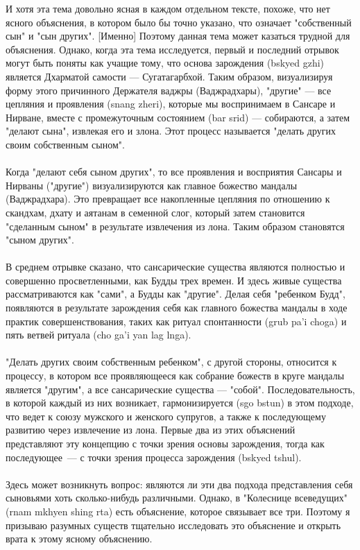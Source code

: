 \begin{siderules}
И хотя эта тема довольно ясная в каждом отдельном тексте, похоже, что нет ясного
объяснения, в котором было бы точно указано, что означает "собственный сын" и "сын
других". [Именно] Поэтому данная тема может казаться трудной для объяснения.
Однако, когда эта тема исследуется, первый и последний отрывок могут быть поняты как учащие
тому, что основа зарождения (bskyed gzhi) является Дхарматой самости — Сугатагарбхой.
Таким образом, визуализируя форму этого причинного Держателя ваджры (Ваджрадхары),
"другие" — все цепляния и проявления (snang zheri), которые мы воспринимаем в Сансаре и
Нирване, вместе с промежуточным состоянием (bar srid) — собираются, а затем
"делают сына", извлекая его и злона. Этот процесс называется "делать других
своим собственным сыном".\\
\\
Когда "делают себя сыном других", то все проявления и восприятия Сансары и Нирваны
("другие") визуализируются как главное божество мандалы (Ваджрадхара). Это превращает
все накопленные цепляния по отношению к скандхам, дхату и аятанам в семенной слог,
который затем становится "сделанным сыном" в результате извлечения из лона. Таким
образом становятся "сыном других".\\
\\
В среднем отрывке сказано, что сансарические существа являются полностью и совершенно
просветленными, как Будды трех времен. И здесь живые существа рассматриваются как
"сами", а Будды как "другие". Делая себя "ребенком Будд", появляются в результате
зарождения себя как главного божества мандалы в ходе практик совершенствования,
таких как ритуал спонтанности (grub pa'i choga) и пять ветвей ритуала (cho ga'i yan lag lnga).\\
\\
"Делать других своим собственным ребенком", с другой стороны, относится к процессу,
в котором все проявляющееся как собрание божеств в круге мандалы является "другим",
а все сансарические существа — "собой". Последовательность, в которой каждый из них возникает,
гармонизируется (sgo bstun) в этом подходе, что ведет к союзу мужского и женского
супругов, а также к последующему развитию через извлечение из лона. Первые два из этих
объяснений представляют эту концепцию с точки зрения основы зарождения, тогда как
последующее — с точки зрения процесса зарождения (bskyed tshul).\\
\\
Здесь может возникнуть вопрос: являются ли эти два подхода представления себя сыновьями
хоть сколько-нибудь различными. Однако, в "Колеснице всеведущих" (rnam mkhyen shing
rta) есть объяснение, которое связывает все три. Поэтому я призываю разумных существ
тщательно исследовать это объяснение и открыть врата к этому ясному объяснению.\\
\\
\end{siderules}

